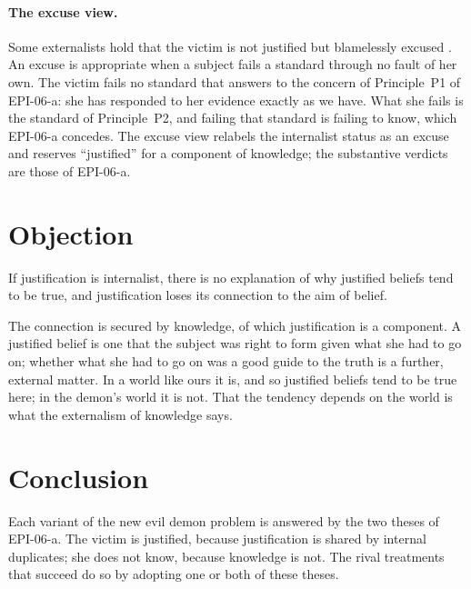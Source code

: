 \documentclass{situationist-preprint}
\begin{document}
\paragraph{The excuse view.} Some externalists hold that the victim is not justified but blamelessly excused \citep{Littlejohn2012}. An excuse is appropriate when a subject fails a standard through no fault of her own. The victim fails no standard that answers to the concern of Principle~P1 of EPI-06-a: she has responded to her evidence exactly as we have. What she fails is the standard of Principle~P2, and failing that standard is failing to know, which EPI-06-a concedes. The excuse view relabels the internalist status as an excuse and reserves \enquote{justified} for a component of knowledge; the substantive verdicts are those of EPI-06-a.

\section{Objection}

\begin{objection}
If justification is internalist, there is no explanation of why justified beliefs tend to be true, and justification loses its connection to the aim of belief.
\end{objection}

\begin{reply}
The connection is secured by knowledge, of which justification is a component. A justified belief is one that the subject was right to form given what she had to go on; whether what she had to go on was a good guide to the truth is a further, external matter. In a world like ours it is, and so justified beliefs tend to be true here; in the demon's world it is not. That the tendency depends on the world is what the externalism of knowledge says.
\end{reply}

\section{Conclusion}

Each variant of the new evil demon problem is answered by the two theses of EPI-06-a. The victim is justified, because justification is shared by internal duplicates; she does not know, because knowledge is not. The rival treatments that succeed do so by adopting one or both of these theses.
\end{document}
